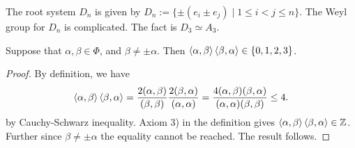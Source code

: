 \documentclass{article}
\begin{document}
\begin{example}
    The root system $D_n$ is given by $D_n := \{ \pm(e_i \pm e_j) \mid 1 \leq i < j \leq n \}$. The Weyl group for $D_n$ is complicated. The fact is $D_3 \simeq A_3$.
\end{example}
\nogap
\begin{example}
    
\end{example}
\nogap
\begin{remark}
    
\end{remark}

\begin{lemma}
    Suppose that $\alpha, \beta \in \Phi$, and $\beta \neq \pm \alpha$. Then $\left\langle \alpha, \beta \right\rangle \left\langle \beta, \alpha \right\rangle \in \{ 0, 1, 2, 3 \}$.
\end{lemma}

\begin{proof}
    By definition, we have
    \[
        \left\langle \alpha, \beta \right\rangle \left\langle \beta, \alpha \right\rangle = \frac{2(\alpha, \beta)}{(\beta, \beta)} \frac{2(\beta, \alpha)}{(\alpha, \alpha)} = \frac{4(\alpha, \beta)(\beta, \alpha)}{(\alpha, \alpha)(\beta, \beta)} \leq 4.
    \]
    by Cauchy-Schwarz inequality. Axiom 3) in the definition gives $\left\langle \alpha, \beta \right\rangle \left\langle \beta, \alpha \right\rangle \in \mathbb{Z}$. Further since $\beta \neq \pm \alpha$ the equality cannot be reached. The result follows.
\end{proof}
\end{document}
